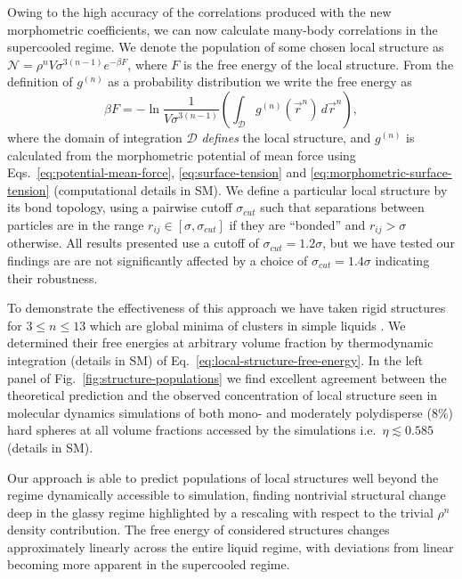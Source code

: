 \documentclass[11pt,twoside]{report}
\begin{document}
Owing to the high accuracy of the correlations produced with the new morphometric coefficients, we can now calculate many-body correlations in the supercooled regime.
We denote the population of some chosen local structure as $\mathcal{N} = \rho^n V \sigma^{3(n-1)} e^{-\beta F}$, where $F$ is the free energy of the local structure.
From the definition of $g^{(n)}$ as a probability distribution we write the free energy as
\begin{equation}\label{eq:local-structure-free-energy}
  \beta F = -\ln{
    \frac{1}{V \sigma^{3(n-1)}}
    \left(
    \int_{\mathcal{D}}
    g^{(n)}(\vec{r}^n) \, d\vec{r}^n
    \right)
  },
\end{equation}
where the domain of integration $\mathcal{D}$ \emph{defines} the local structure, and $g^{(n)}$ is calculated from the morphometric potential of mean force using Eqs.\ \eqref{eq:potential-mean-force}, \eqref{eq:surface-tension} and \eqref{eq:morphometric-surface-tension} (computational details in SM).
We define a particular local structure by its bond topology, using a pairwise cutoff $\sigma_{cut}$ such that separations between particles are in the range $r_{ij} \in [\sigma, \sigma_{cut}]$ if they are ``bonded'' and $r_{ij} > \sigma$ otherwise.
All results presented use a cutoff of $\sigma_{cut}=1.2 \sigma$, but we have tested our findings are are not significantly affected by a choice of $\sigma_{cut}=1.4 \sigma$ indicating their robustness.

To demonstrate the effectiveness of this approach we have taken rigid structures for $3 \le n \le 13$ which are global minima of clusters in simple liquids \cite{Wales2004}.
We determined their free energies at arbitrary volume fraction by thermodynamic integration (details in SM) of Eq.\ \eqref{eq:local-structure-free-energy}.
In the left panel of Fig.\ \ref{fig:structure-populations} we find excellent agreement between the theoretical prediction and the observed concentration of local structure seen in molecular dynamics simulations of both mono- and moderately polydisperse (8\%) hard spheres at all volume fractions accessed by the simulations i.e.\ $\eta \lesssim 0.585$ (details in SM).

Our approach is able to predict populations of local structures well beyond the regime dynamically accessible to simulation, finding nontrivial structural change deep in the glassy regime highlighted by a rescaling with respect to the trivial $\rho^n$ density contribution.
The free energy of considered structures changes approximately linearly across the entire liquid regime, with deviations from linear becoming more apparent in the supercooled regime.
\end{document}
